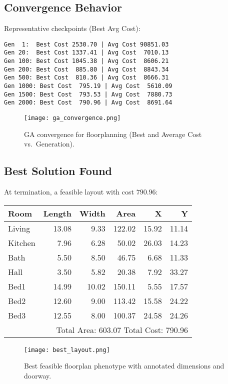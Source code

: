\documentclass{article}
\begin{document}
\subsection{Convergence Behavior}
Representative checkpoints (Best \textbar{} Avg Cost):
\begin{verbatim}
Gen  1:  Best Cost 2530.70 | Avg Cost 90851.03
Gen 20:  Best Cost 1337.41 | Avg Cost  7010.13
Gen 100: Best Cost 1045.38 | Avg Cost  8606.21
Gen 200: Best Cost  885.80 | Avg Cost  8843.34
Gen 500: Best Cost  810.36 | Avg Cost  8666.31
Gen 1000: Best Cost  795.19 | Avg Cost  5610.09
Gen 1500: Best Cost  793.53 | Avg Cost  7880.73
Gen 2000: Best Cost  790.96 | Avg Cost  8691.64
\end{verbatim}

\begin{figure}[H]
    \centering
    \texttt{[image: ga\_convergence.png]}
    \caption{GA convergence for floorplanning (Best and Average Cost vs.\ Generation).}
\end{figure}

\subsection{Best Solution Found}
At termination, a feasible layout with cost $790.96$:

\begin{center}
\begin{tabular}{lrrrrr}
\toprule
Room & Length & Width & Area & X & Y \\
\midrule
Living  & 13.08 &  9.33 & 122.02 & 15.92 & 11.14 \\
Kitchen &  7.96 &  6.28 &  50.02 & 26.03 & 14.23 \\
Bath    &  5.50 &  8.50 &  46.75 &  6.68 & 11.33 \\
Hall    &  3.50 &  5.82 &  20.38 &  7.92 & 33.27 \\
Bed1    & 14.99 & 10.02 & 150.11 &  5.55 & 17.57 \\
Bed2    & 12.60 &  9.00 & 113.42 & 15.58 & 24.22 \\
Bed3    & 12.55 &  8.00 & 100.37 & 24.58 & 24.26 \\
\midrule
\multicolumn{6}{r}{Total Area: 603.07 \qquad Total Cost: 790.96} \\
\bottomrule
\end{tabular}
\end{center}

\begin{figure}[H]
    \centering
    \texttt{[image: best\_layout.png]}
    \caption{Best feasible floorplan phenotype with annotated dimensions and doorway.}
\end{figure}
\end{document}

